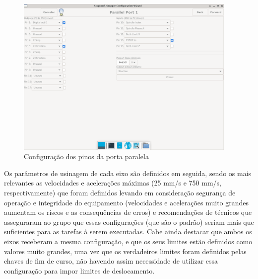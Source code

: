 \begin{figure}[H]
    \begin{center}
        \includegraphics[width=0.95\textwidth]{images/prog/stepconf_config.png}
    \end{center}
    \caption{Configuração dos pinos da porta paralela}\label{pinagem}
\end{figure}

Os parâmetros de usinagem de cada eixo são definidos em seguida, sendo os mais relevantes as velocidades e acelerações máximas (25 mm/s e 750 mm/s, respectivamente) que foram definidos levando em consideração segurança de operação e integridade do equipamento (velocidades e acelerações muito grandes aumentam os riscos e as consequências de erros) e recomendações de técnicos que asseguraram ao grupo que essas configurações (que são o padrão) seriam mais que suficientes para as tarefas à serem executadas. Cabe ainda destacar que ambos os eixos receberam a mesma configuração, e que os seus limites estão definidos como valores muito grandes, uma vez que os verdadeiros limites foram definidos pelas chaves de fim de curso, não havendo assim necessidade de utilizar essa configuração para impor limites de deslocamento.

